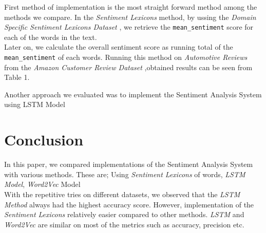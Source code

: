 \documentclass[11pt,a4paper]{article}
\begin{document}
First method of implementation is the most straight forward method among the methods we compare. In the \textit{Sentiment Lexicons} method, by ussing the \textit{Domain Specific Sentiment Lexicons Dataset} \cite{hamilton2016inducing}, we retrieve the \texttt{mean\_sentiment} score for each of the words in the text. \\

Later on, we calculate the overall sentiment score as running total of the \texttt{mean\_sentiment} of each words. 
Running this method on \textit{Automotive Reviews} from the \textit{Amazon Customer Review Dataset} \cite{He_2016, mcauley2015imagebased},obtained results can be seen from Table 1.


Another approach we evaluated was to implement the Sentiment Analysis System using LSTM Model



\section{Conclusion}
In this paper, we compared implementations of the Sentiment Analysis System with various methods. These are; Using \textit{Sentiment Lexicons} of words, \textit{LSTM Model}, \textit{Word2Vec} Model\\

With the repetitive tries on different datasets, we observed that the \textit{LSTM Method} always had the highest accuracy score. However, implementation of the \textit{Sentiment Lexicons} relatively easier compared to other methods. \textit{LSTM} and \textit{Word2Vec} are similar on most of the metrics such as accuracy, precision etc.



\end{document}
